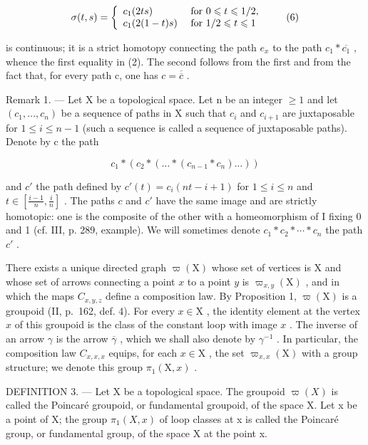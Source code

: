 \[
\sigma (t, s) = \left\{ \begin{array}{l l} c _ {1} (2 t s) & \text { for } 0 \leqslant t \leqslant 1 / 2, \\ c _ {1} (2 (1 - t) s) & \text { for } 1 / 2 \leqslant t \leqslant 1 \end{array} \right.\tag{6}
\]

is continuous; it is a strict homotopy connecting the path \(e_{x}\) to the path \(c_{1}*\overline{c_{1}}\) , whence the first equality in (2). The second follows from the first and from the fact that, for every path c, one has \(c=\overline{\overline{c}}\) .

Remark 1. --- Let X be a topological space. Let n be an integer \(\geqslant 1\) and let \((c_{1},\ldots,c_{n})\) be a sequence of paths in X such that \(c_{i}\) and \(c_{i+1}\) are juxtaposable for \(1 \leqslant i \leqslant n-1\) (such a sequence is called a sequence of juxtaposable paths). Denote by c the path

\[
c _ {1} * \left(c _ {2} * \left(\dots * \left(c _ {n - 1} * c _ {n}\right) \ldots\right)\right)
\]

and \(c'\) the path defined by \(c'(t) = c_i(nt - i + 1)\) for \(1 \leqslant i \leqslant n\) and \(t \in [\frac{i-1}{n}, \frac{i}{n}]\) . The paths \(c\) and \(c'\) have the same image and are strictly homotopic: one is the composite of the other with a homeomorphism of I fixing 0 and 1 (cf. III, p. 289, example). We will sometimes denote \(c_{1} * c_{2} * \cdots * c_{n}\) the path \(c'\) .

There exists a unique directed graph \(\varpi(\mathrm{X})\) whose set of vertices is X and whose set of arrows connecting a point \(x\) to a point \(y\) is \(\varpi_{x,y}(\mathrm{X})\) , and in which the maps \(C_{x,y,z}\) define a composition law. By Proposition 1, \(\varpi(\mathrm{X})\) is a groupoid (II, p.~162, def. 4). For every \(x \in \mathrm{X}\) , the identity element at the vertex \(x\) of this groupoid is the class of the constant loop with image \(x\) . The inverse of an arrow \(\gamma\) is the arrow \(\overline{\gamma}\) , which we shall also denote by \(\gamma^{-1}\) . In particular, the composition law \(C_{x,x,x}\) equips, for each \(x \in \mathrm{X}\) , the set \(\varpi_{x,x}(\mathrm{X})\) with a group structure; we denote this group \(\pi_1(\mathrm{X}, x)\) .

DEFINITION 3. --- Let X be a topological space. The groupoid \(\varpi(X)\) is called the Poincaré groupoid, or fundamental groupoid, of the space X. Let x be a point of X; the group \(\pi_1(X,x)\) of loop classes at x is called the Poincaré group, or fundamental group, of the space X at the point x.

